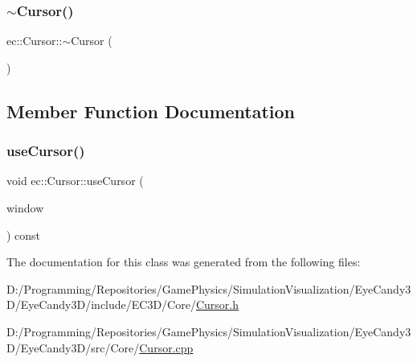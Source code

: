 \mbox{\label{classec_1_1_cursor_a4617172c5106164b27ef856df0b078c3}} 
\subsubsection{\texorpdfstring{$\sim$\+Cursor()}{~Cursor()}}
{\footnotesize\ttfamily ec\+::\+Cursor\+::$\sim$\+Cursor (\begin{DoxyParamCaption}{ }\end{DoxyParamCaption})\hspace{0.3cm}{\ttfamily [default]}}



\subsection{Member Function Documentation}
\mbox{\label{classec_1_1_cursor_ad99efc837c8f7fb348d2ea7c3bd230d4}} 
\subsubsection{\texorpdfstring{use\+Cursor()}{useCursor()}}
{\footnotesize\ttfamily void ec\+::\+Cursor\+::use\+Cursor (\begin{DoxyParamCaption}\item[{G\+L\+F\+Wwindow $\ast$}]{window }\end{DoxyParamCaption}) const}



The documentation for this class was generated from the following files\+:\begin{DoxyCompactItemize}
\item 
D\+:/\+Programming/\+Repositories/\+Game\+Physics/\+Simulation\+Visualization/\+Eye\+Candy3\+D/\+Eye\+Candy3\+D/include/\+E\+C3\+D/\+Core/\mbox{\hyperlink{_cursor_8h}{Cursor.\+h}}\item 
D\+:/\+Programming/\+Repositories/\+Game\+Physics/\+Simulation\+Visualization/\+Eye\+Candy3\+D/\+Eye\+Candy3\+D/src/\+Core/\mbox{\hyperlink{_cursor_8cpp}{Cursor.\+cpp}}\end{DoxyCompactItemize}
